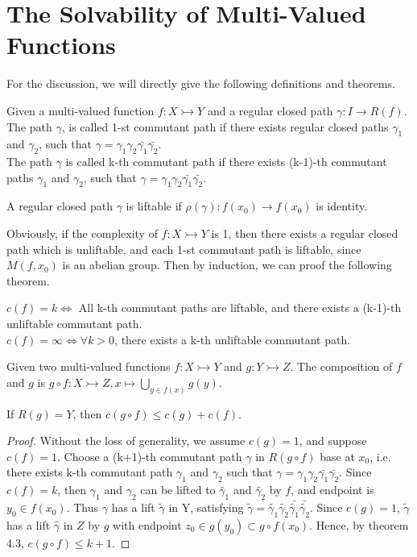 \documentclass[12pt]{article}
\newenvironment{definition}[2][Definition]{\begin{trivlist}
\item[\hskip \labelsep {\bfseries #1}\hskip \labelsep {\bfseries #2.}]}{\end{trivlist}}
\newenvironment{theorem}[2][Theorem]{\begin{trivlist}
\item[\hskip \labelsep {\bfseries #1}\hskip \labelsep {\bfseries #2.}]}{\end{trivlist}}
\begin{document}
\section{The Solvability of Multi-Valued Functions}
For the discussion, we will directly give the following definitions and theorems.
\begin{definition}{4.1}
    Given a multi-valued function $f:X\rightarrowtail Y$ and a regular closed path $\gamma:I\to R(f)$. The path $\gamma$, is called 1-st commutant path if there exists regular closed paths $\gamma_1$ and $\gamma_2$, such that $\gamma = \gamma_1 \gamma_2 \bar{\gamma_1}\bar{\gamma_2}$. \\
    The path $\gamma$ is called k-th commutant path if there exists (k-1)-th commutant paths $\gamma_1$ and $\gamma_2$, such that $\gamma = \gamma_1 \gamma_2 \bar{\gamma_1}\bar{\gamma_2}$.
\end{definition}
\begin{definition}{4.2}
    A regular closed path $\gamma$ is liftable if $\rho(\gamma): f(x_0)\to f(x_0)$ is identity. 
\end{definition}
Obviously, if the complexity of $f:X\rightarrowtail Y$ is 1, then there exists a regular closed path which is unliftable, and each 1-st commutant path is liftable, since $M(f,x_0)$ is an abelian group.
Then by induction, we can proof the following theorem.
\begin{theorem}{4.3}

    $c(f)=k \Leftrightarrow$ All k-th commutant paths are liftable, and there exists a (k-1)-th unliftable commutant path.\\
    $c(f)=\infty \Leftrightarrow \forall k>0$, there exists a k-th unliftable commutant path.
\end{theorem}
\begin{definition}{4.4}
    Given two multi-valued functions $f:X\rightarrowtail Y$ and $g:Y\rightarrowtail Z$. The composition of $f$ and $g$ is $g\circ f:X\rightarrowtail Z,x\mapsto \bigcup_{y\in f(x)}g(y)$.
\end{definition}
\begin{theorem}{4.5}
    If $R(g)=Y$, then $c(g\circ f)\leq c(g)+c(f)$.
\end{theorem}
\begin{proof}
    Without the loss of generality, we assume $c(g)=1$, and suppose $c(f)=1$. Choose a (k+1)-th commutant path $\gamma$ in $R(g\circ f)$ base at $x_0$, i.e. there exists k-th commutant path $\gamma_1$ and $\gamma_2$ such that $\gamma=\gamma_1 \gamma_2 \bar{\gamma_1}\bar{\gamma_2}$. Since $c(f) = k$, then $\gamma_1$ and $\gamma_2$ can be lifted to $\tilde{\gamma_1}$ and $\tilde{\gamma_2}$ by $f$, and endpoint is $y_0\in f(x_0)$. Thus $\gamma$ has a lift $\tilde{\gamma}$ in Y, satisfying $\tilde{\gamma}=\tilde{\gamma_1}\tilde{\gamma_2}\bar{\tilde{\gamma_1}}\bar{\tilde{\gamma_2}}$. Since $c(g)=1$, $\tilde{\gamma}$ has a lift $\hat{\gamma}$ in $Z$ by $g$ with endpoint $z_0 \in g(y_0)\subset g \circ f(x_0)$. Hence, by theorem 4.3, $c(g\circ f)\leq k+1$.
\end{proof}
\end{document}
